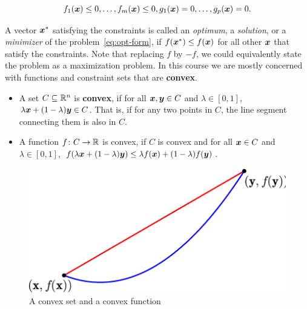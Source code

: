 \begin{equation*}
f_1(\bm{x})\leq 0, \dots, f_m(\bm{x})\leq 0, g_1(\bm{x})=0, \dots, g_p(\bm{x})=0.
\end{equation*}

A vector $\bm{x}^*$ satisfying the constraints is called an {\em optimum}, a {\em solution}, or a {\em minimizer} of the problem~\eqref{eq:opt-form}, if $f(\bm{x}^*)\leq f(\bm{x})$ for all other $\bm{x}$ that satisfy the constraints. Note that replacing $f$ by $-f$, we could equivalently state the problem as a maximization problem. In this course we are mostly concerned with functions and constraint sets that are \textbf{convex}.

\begin{itemize}
\item A set $C\subseteq \mathbb{R}^n$ is \textbf{convex}, if for all $\bm{x},\bm{y}\in C$ and $\lambda\in [0,1]$, $\lambda \bm{x}+(1-\lambda)\bm{y}\in C$. That is, if for any two points in $C$, the line segment connecting them is also in $C$. 
\item A function $f\colon C\to \mathbb{R}$ is convex, if $C$ is convex and for all $\bm{x}\in C$ and $\lambda\in [0,1]$, $f(\lambda \bm{x}+(1-\lambda)\bm{y})\leq \lambda f(\bm{x})+(1-\lambda)f(\bm{y})$. 
\end{itemize}

\begin{figure}
\centering
\begin{minipage}{0.45\textwidth}
\end{minipage}
%
\begin{minipage}{0.45\textwidth}
\includegraphics[width=1.0\textwidth]{images/convf-crop.pdf}
\end{minipage}
\caption{A convex set and a convex function}
\end{figure}

